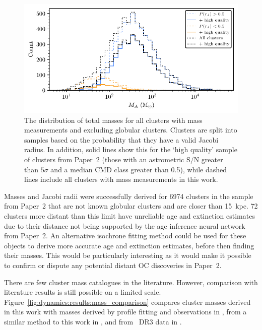 \begin{figure}[t]
    \centering
    \includegraphics[width=\textwidth]{fig/c4/results_mass_distribution.pdf}
    \caption[The distribution of total masses for all clusters with mass measurements]{The distribution of total masses for all clusters with mass measurements and excluding globular clusters. Clusters are split into samples based on the probability that they have a valid Jacobi radius. In addition, solid lines show this for the `high quality' sample of clusters from Paper~2 (those with an astrometric S/N greater than $5\sigma$ and a median CMD class greater than 0.5), while dashed lines include all clusters with mass measurements in this work.}
    \label{fig:dynamics:results:mass_distribution}
\end{figure}

Masses and Jacobi radii were successfully derived for 6974 clusters in the sample from Paper~2 that are not known globular clusters and are closer than 15~kpc. 72 clusters more distant than this limit have unreliable age and extinction estimates due to their distance not being supported by the age inference neural network from Paper~2. An alternative isochrone fitting method could be used for these objects to derive more accurate age and extinction estimates, before then finding their masses. This would be particularly interesting as it would make it possible to confirm or dispute any potential distant OC discoveries in Paper~2.

There are few cluster mass catalogues in the literature. However, comparison with literature results is still possible on a limited scale. Figure~\ref{fig:dynamics:results:mass_comparison} compares cluster masses derived in this work with masses derived by profile fitting and observations in \cite{piskunov_tidal_2008}, from a similar method to this work in \cite{meingast_extended_2021}, and from \gaia\ DR3 data in \cite{cordoni_photometric_binaries_2023}. 

